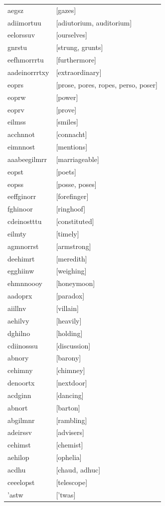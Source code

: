 \documentclass{article}
\begin{document}
\begin{tabular}{ll}
aegsz & [gazes] \\
adiimortuu & [adiutorium, auditorium] \\
eelorssuv & [ourselves] \\
gnrstu & [strung, grunts] \\
eefhmorrrtu & [furthermore] \\
aadeinorrrtxy & [extraordinary] \\
eoprs & [prose, pores, ropes, perso, poser] \\
eoprw & [power] \\
eoprv & [prove] \\
eilmss & [smiles] \\
acchnnot & [connacht] \\
eimnnost & [mentions] \\
aaabeegilmrr & [marriageable] \\
eopst & [poets] \\
eopss & [posse, poses] \\
eeffginorr & [forefinger] \\
fghinoor & [ringhoof] \\
cdeinostttu & [constituted] \\
eilmty & [timely] \\
agmnorrst & [armstrong] \\
deehimrt & [meredith] \\
egghiinw & [weighing] \\
ehmnnoooy & [honeymoon] \\
aadoprx & [paradox] \\
aiillnv & [villain] \\
aehilvy & [heavily] \\
dghilno & [holding] \\
cdiinosssu & [discussion] \\
abnory & [barony] \\
cehimny & [chimney] \\
denoortx & [nextdoor] \\
acdginn & [dancing] \\
abnort & [barton] \\
abgilmnr & [rambling] \\
adeirssv & [advisers] \\
cehimst & [chemist] \\
aehilop & [ophelia] \\
acdhu & [chaud, adhuc] \\
ceeelopst & [telescope] \\
'astw & ['twas] \\

\end{tabular}
\end{document}
